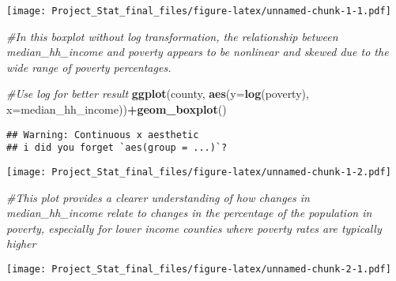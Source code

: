 \documentclass[
]{article}
\newenvironment{Shaded}{\begin{snugshade}}{\end{snugshade}}
\newcommand{\AttributeTok}[1]{\textcolor[rgb]{0.13,0.29,0.53}{#1}}
\newcommand{\CommentTok}[1]{\textcolor[rgb]{0.56,0.35,0.01}{\textit{#1}}}
\newcommand{\FunctionTok}[1]{\textcolor[rgb]{0.13,0.29,0.53}{\textbf{#1}}}
\newcommand{\NormalTok}[1]{#1}
\newcommand{\SpecialCharTok}[1]{\textcolor[rgb]{0.81,0.36,0.00}{\textbf{#1}}}
\begin{document}
\texttt{[image: Project\_Stat\_final\_files/figure-latex/unnamed-chunk-1-1.pdf]}

\begin{Shaded}
\begin{Highlighting}[]
\CommentTok{\#In this boxplot without log transformation, the relationship between median\_hh\_income and poverty appears to be nonlinear and skewed due to the wide range of poverty percentages.}

\CommentTok{\#Use log for better result}
\FunctionTok{ggplot}\NormalTok{(county, }\FunctionTok{aes}\NormalTok{(}\AttributeTok{y=}\FunctionTok{log}\NormalTok{(poverty), }\AttributeTok{x=}\NormalTok{median\_hh\_income))}\SpecialCharTok{+}\FunctionTok{geom\_boxplot}\NormalTok{()}
\end{Highlighting}
\end{Shaded}

\begin{verbatim}
## Warning: Continuous x aesthetic
## i did you forget `aes(group = ...)`?
\end{verbatim}

\texttt{[image: Project\_Stat\_final\_files/figure-latex/unnamed-chunk-1-2.pdf]}

\begin{Shaded}
\begin{Highlighting}[]
\CommentTok{\#This plot provides a clearer understanding of how changes in median\_hh\_income relate to changes in the percentage of the population in poverty, especially for lower income counties where poverty rates are typically higher}
\end{Highlighting}
\end{Shaded}

\begin{Shaded}
\end{Shaded}

\texttt{[image: Project\_Stat\_final\_files/figure-latex/unnamed-chunk-2-1.pdf]}

\begin{Shaded}
\end{Shaded}
\end{document}
